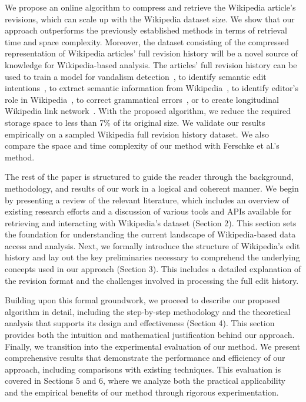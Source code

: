 \documentclass[acmsmall]{acmart}
\begin{document}
We propose an online algorithm to compress and retrieve the Wikipedia article's revisions, which can scale up with the Wikipedia dataset size. We show that our approach outperforms the previously established methods in terms of retrieval time and space complexity. Moreover, the dataset consisting of the compressed representation of Wikipedia articles' full revision history will be a novel source of knowledge for Wikipedia-based analysis. The articles' full revision history can be used to train a model for vandalism detection~\cite{chin2010detecting}, to identify semantic edit intentions~\cite{yang2017identifying}, to extract semantic information from Wikipedia~\cite{tran2017hedera}, to identify editor's role in Wikipedia~\cite{yang2016did}, to correct grammatical errors~\cite{boyd2018using}, or to create longitudinal Wikipedia link network~\cite{consonni2019wikilinkgraphs}. With the proposed algorithm, we reduce the required storage space to less than 7\% of its original size. We validate our results empirically on a sampled Wikipedia full revision history dataset. We also compare the space and time complexity of our method with Ferschke et al.'s method.	

The rest of the paper is structured to guide the reader through the background, methodology, and results of our work in a logical and coherent manner. We begin by presenting a review of the relevant literature, which includes an overview of existing research efforts and a discussion of various tools and APIs available for retrieving and interacting with Wikipedia's dataset (Section 2). This section sets the foundation for understanding the current landscape of Wikipedia-based data access and analysis. Next, we formally introduce the structure of Wikipedia's edit history and lay out the key preliminaries necessary to comprehend the underlying concepts used in our approach (Section 3). This includes a detailed explanation of the revision format and the challenges involved in processing the full edit history.

Building upon this formal groundwork, we proceed to describe our proposed algorithm in detail, including the step-by-step methodology and the theoretical analysis that supports its design and effectiveness (Section 4). This section provides both the intuition and mathematical justification behind our approach. Finally, we transition into the experimental evaluation of our method. We present comprehensive results that demonstrate the performance and efficiency of our approach, including comparisons with existing techniques. This evaluation is covered in Sections 5 and 6, where we analyze both the practical applicability and the empirical benefits of our method through rigorous experimentation.
  
\end{document}
